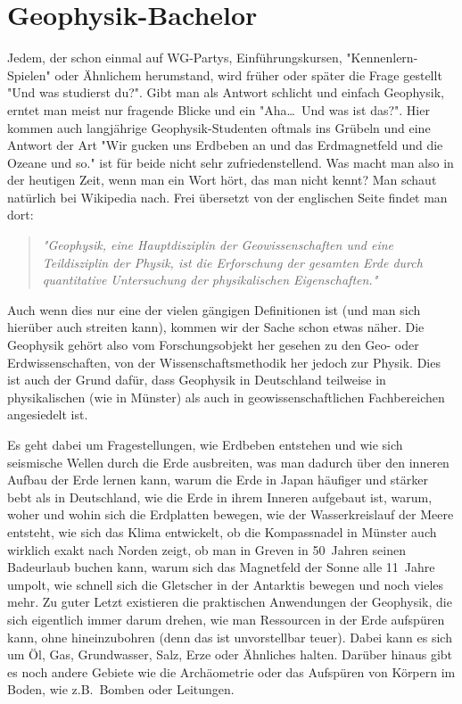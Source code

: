 
\vspace{-1cm}
\section{Geophysik-Bachelor}
\begin{multicols}{2}
Jedem, der schon einmal auf WG-Partys, Einführungskursen, "Kennenlern-Spielen" oder Ähnlichem herumstand, wird früher oder später die Frage gestellt "Und was studierst du?". Gibt man als Antwort schlicht und einfach Geophysik, erntet man meist nur fragende Blicke und ein "Aha\dots\ Und was ist das?". Hier kommen auch langjährige Geophysik-Studenten oftmals ins Grübeln und eine Antwort der Art "Wir gucken uns Erdbeben an und das Erdmagnetfeld und die Ozeane und so." ist für beide nicht sehr zufriedenstellend. Was macht man also in der heutigen Zeit, wenn man ein Wort hört, das man nicht kennt? Man schaut natürlich bei Wikipedia nach. Frei übersetzt von der englischen Seite findet man dort:
\begin{quote}
\textit{"Geophysik, eine Hauptdisziplin der Geowissenschaften und eine Teildisziplin der Physik, ist die Erforschung der gesamten Erde durch quantitative Untersuchung der physikalischen Eigenschaften."}
\end{quote}

Auch wenn dies nur eine der vielen gängigen Definitionen ist (und man sich hierüber auch streiten kann), kommen wir der Sache schon etwas näher. Die Geophysik gehört also vom Forschungsobjekt her gesehen zu den Geo- oder Erdwissenschaften, von der Wissenschaftsmethodik her jedoch zur Physik. Dies ist auch der Grund dafür, dass Geophysik in Deutschland teilweise in physikalischen (wie in Münster) als auch in geowissenschaftlichen Fachbereichen angesiedelt ist.

Es geht dabei um Fragestellungen, wie Erdbeben entstehen und wie sich seismische Wellen durch die Erde ausbreiten, was man dadurch über den inneren Aufbau der Erde lernen kann, warum die Erde in Japan häufiger und stärker bebt als in Deutschland, wie die Erde in ihrem Inneren aufgebaut ist, warum, woher und wohin sich die Erdplatten bewegen, wie der Wasserkreislauf der Meere entsteht, wie sich das Klima entwickelt, ob die Kompassnadel in Münster auch wirklich exakt nach Norden zeigt, ob man in Greven in 50~Jahren seinen Badeurlaub buchen kann, warum sich das Magnetfeld der Sonne alle 11~Jahre umpolt, wie schnell sich die Gletscher in der Antarktis bewegen und noch vieles mehr. Zu guter Letzt existieren die praktischen Anwendungen der Geophysik, die sich eigentlich immer darum drehen, wie man Ressourcen in der Erde aufspüren kann, ohne hineinzubohren (denn das ist unvorstellbar teuer). Dabei kann es sich um Öl, Gas, Grundwasser, Salz, Erze oder Ähnliches halten. Darüber hinaus gibt es noch andere Gebiete wie die Archäometrie oder das Aufspüren von Körpern im Boden, wie z.B.\ Bomben oder Leitungen.


\end{multicols}
